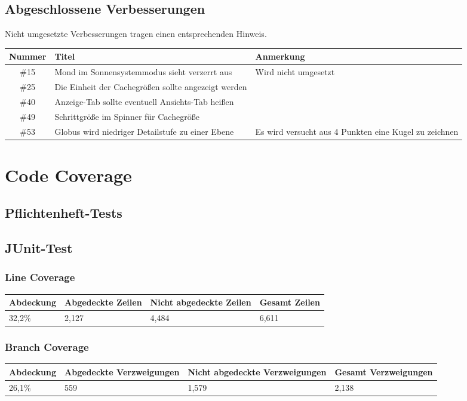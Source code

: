 \documentclass[10pt]{scrreprt}
\begin{document}
\section{Abgeschlossene Verbesserungen}
Nicht umgesetzte Verbesserungen tragen einen entsprechenden Hinweis.
\begin{longtable}{|c|p{5.2cm}|p{8.2cm}|}
\hline
Nummer & Titel & Anmerkung \\
\hline
\hline
\#15 & Mond im Sonnensystemmodus sieht verzerrt aus & Wird nicht umgesetzt \\
\hline
\#25 & Die Einheit der Cachegrößen sollte angezeigt werden & \\ 
\hline
\#40 & Anzeige-Tab sollte eventuell Ansichts-Tab heißen & \\
\hline
\#49 & Schrittgröße im Spinner für Cachegröße & \\
\hline
\#53 & Globus wird niedriger Detailstufe zu einer Ebene & Es wird versucht aus 4 Punkten eine Kugel zu zeichnen \\
\hline
\end{longtable}

\chapter{Code Coverage}
\section{Pflichtenheft-Tests}
\section{JUnit-Test}
\subsection{Line Coverage}
\begin{longtable}{|l|p{}|p{}|p{}|}
\hline
Abdeckung & Abgedeckte Zeilen & Nicht abgedeckte Zeilen & Gesamt Zeilen \\
\hline
\hline
32,2\% & 2,127 & 4,484 & 6,611 \\
\hline
\end{longtable}
\subsection{Branch Coverage}
\begin{longtable}{|l|p{}|p{}|p{}|}
\hline
Abdeckung & Abgedeckte Verzweigungen & Nicht abgedeckte Verzweigungen & Gesamt Verzweigungen \\
\hline
\hline
26,1\% & 559 & 1,579 & 2,138 \\
\hline
\end{longtable}
\end{document}

